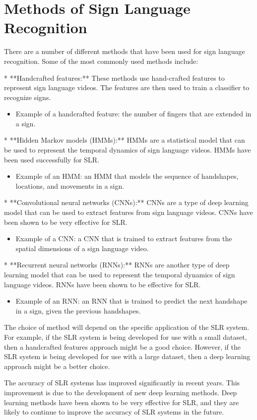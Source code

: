 \section{Methods of Sign Language Recognition}

There are a number of different methods that have been used for sign language recognition. Some of the most commonly used methods include:

* **Handcrafted features:** These methods use hand-crafted features to represent sign language videos. The features are then used to train a classifier to recognize signs.

\begin{itemize}
	\item Example of a handcrafted feature: the number of fingers that are extended in a sign.
\end{itemize}

* **Hidden Markov models (HMMs):** HMMs are a statistical model that can be used to represent the temporal dynamics of sign language videos. HMMs have been used successfully for SLR.

\begin{itemize}
	\item Example of an HMM: an HMM that models the sequence of handshapes, locations, and movements in a sign.
\end{itemize}

* **Convolutional neural networks (CNNs):** CNNs are a type of deep learning model that can be used to extract features from sign language videos. CNNs have been shown to be very effective for SLR.

\begin{itemize}
	\item Example of a CNN: a CNN that is trained to extract features from the spatial dimensions of a sign language video.
\end{itemize}

* **Recurrent neural networks (RNNs):** RNNs are another type of deep learning model that can be used to represent the temporal dynamics of sign language videos. RNNs have been shown to be effective for SLR.

\begin{itemize}
	\item Example of an RNN: an RNN that is trained to predict the next handshape in a sign, given the previous handshapes.
\end{itemize}

The choice of method will depend on the specific application of the SLR system. For example, if the SLR system is being developed for use with a small dataset, then a handcrafted features approach might be a good choice. However, if the SLR system is being developed for use with a large dataset, then a deep learning approach might be a better choice.

The accuracy of SLR systems has improved significantly in recent years. This improvement is due to the development of new deep learning methods. Deep learning methods have been shown to be very effective for SLR, and they are likely to continue to improve the accuracy of SLR systems in the future.
